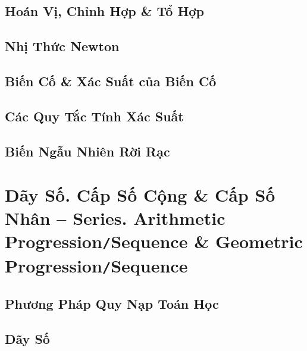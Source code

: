 \documentclass[oneside]{book}
\numberwithin{equation}{section}
\begin{document}
\section{Hoán Vị, Chỉnh Hợp \& Tổ Hợp}


\section{Nhị Thức Newton}


\section{Biến Cố \& Xác Suất của Biến Cố}


\section{Các Quy Tắc Tính Xác Suất}


\section{Biến Ngẫu Nhiên Rời Rạc}


\chapter{Dãy Số. Cấp Số Cộng \& Cấp Số Nhân -- Series. Arithmetic Progression\texttt{/}Sequence \& Geometric Progression\texttt{/}Sequence}

\section{Phương Pháp Quy Nạp Toán Học}


\section{Dãy Số}
\end{document}
